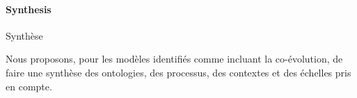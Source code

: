 \paragraph{Synthesis}{Synthèse}

Nous proposons, pour les modèles identifiés comme incluant la co-évolution, de faire une synthèse des ontologies, des processus, des contextes et des échelles pris en compte.









\stars



